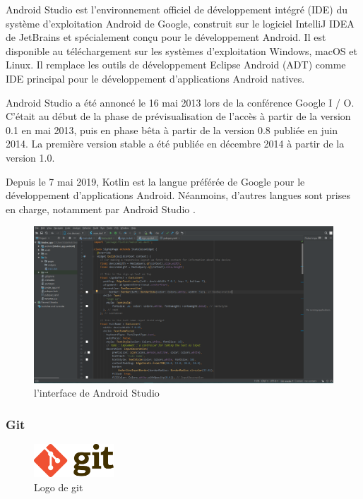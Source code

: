 Android Studio est l'environnement officiel de développement intégré (\acrshort{IDE}) du système d'exploitation Android de Google, construit sur le logiciel IntelliJ IDEA de JetBrains et spécialement conçu pour le développement Android. Il est disponible au téléchargement sur les systèmes d'exploitation Windows, macOS et Linux. Il remplace les outils de développement Eclipse Android (ADT) comme IDE principal pour le développement d'applications Android natives.

Android Studio a été annoncé le 16 mai 2013 lors de la conférence Google I / O. C'était au début de la phase de prévisualisation de l'accès à partir de la version 0.1 en mai 2013, puis en phase bêta à partir de la version 0.8 publiée en juin 2014. La première version stable a été publiée en décembre 2014 à partir de la version 1.0.

Depuis le 7 mai 2019, Kotlin est la langue préférée de Google pour le développement d'applications Android. Néanmoins, d’autres langues sont prises en charge, notamment par Android Studio \cite{noauthor_android_nodate}.

\begin{figure}[H]
	\centering
		\includegraphics[width=14cm]{Images/chapter3/android_studio_interface.png}
		\caption{{\footnotesize l'interface de Android Studio}}
\end{figure}

\newpage

\subsubsection{Git}

\begin{figure}
	\includegraphics[width=3cm]{Images/chapter3/git_logo.png}
	\vspace{-10pt}
	\caption{{\footnotesize Logo de git}}
\end{figure}

